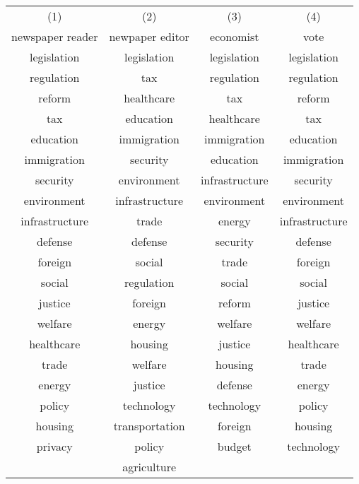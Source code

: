 {
\def\sym#1{\ifmmode^{#1}\else\(^{#1}\)\fi}
\begin{tabular}{c c c c}
\hline\hline

\multicolumn{1}{c}{(1)}
&\multicolumn{1}{c}{(2)}
&\multicolumn{1}{c}{(3)}
&\multicolumn{1}{c}{(4)}
\\

\multicolumn{1}{c}{newspaper reader}
&\multicolumn{1}{c}{newpaper editor}
&\multicolumn{1}{c}{economist}
&\multicolumn{1}{c}{vote}
\\
\hline
legislation & legislation & legislation & legislation \\
regulation & tax & regulation & regulation \\
reform & healthcare & tax & reform \\
tax & education & healthcare & tax \\
education & immigration & immigration & education \\
immigration & security & education & immigration \\
security & environment & infrastructure & security \\
environment & infrastructure & environment & environment \\
infrastructure & trade & energy & infrastructure \\
defense & defense & security & defense \\
foreign & social & trade & foreign \\
social & regulation & social & social \\
justice & foreign & reform & justice \\
welfare & energy & welfare & welfare \\
healthcare & housing & justice & healthcare \\
trade & welfare & housing & trade \\
energy & justice & defense & energy \\
policy & technology & technology & policy \\
housing & transportation & foreign & housing \\
privacy & policy & budget & technology \\
 & agriculture &  & \\
\hline\hline
\end{tabular}
}
